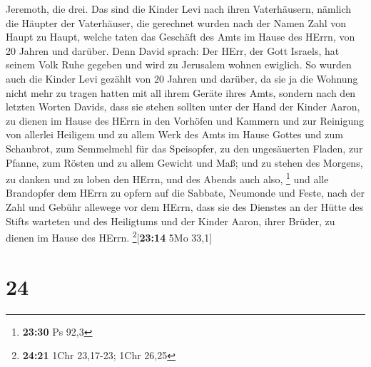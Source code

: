 Jeremoth, die drei.  Das sind die Kinder Levi nach ihren
Vaterhäusern, nämlich die Häupter der Vaterhäuser, die gerechnet wurden
nach der Namen Zahl von Haupt zu Haupt, welche taten das Geschäft des
Amts im Hause des HErrn, von 20 Jahren und darüber.  Denn
David sprach: Der HErr, der Gott Israels, hat seinem Volk Ruhe gegeben
und wird zu Jerusalem wohnen ewiglich.  So wurden auch
die Kinder Levi gezählt von 20 Jahren und darüber, da sie ja die Wohnung
nicht mehr zu tragen hatten mit all ihrem Geräte ihres Amts,
 sondern nach den letzten Worten Davids, 
dass sie stehen sollten unter der Hand der Kinder Aaron, zu dienen im
Hause des HErrn in den Vorhöfen und Kammern und zur Reinigung von
allerlei Heiligem und zu allem Werk des Amts im Hause Gottes
 und zum Schaubrot, zum Semmelmehl für das Speisopfer, zu
den ungesäuerten Fladen, zur Pfanne, zum Rösten und zu allem Gewicht und
Maß;  und zu stehen des Morgens, zu danken und zu loben
den HErrn, und des Abends auch also, \footnote{\textbf{23:30} Ps 92,3}
 und alle Brandopfer dem HErrn zu opfern auf die Sabbate,
Neumonde und Feste, nach der Zahl und Gebühr allewege vor dem HErrn,
 dass sie des Dienstes an der Hütte des Stifts warteten
und des Heiligtums und der Kinder Aaron, ihrer Brüder, zu dienen im
Hause des HErrn. \footnote{\textbf{24:21} 1Chr 23,17-23; 1Chr 26,25}{[}\textbf{23:14}
5Mo 33,1{]}

\hypertarget{section-23}{%
\section{24}\label{section-23}}


